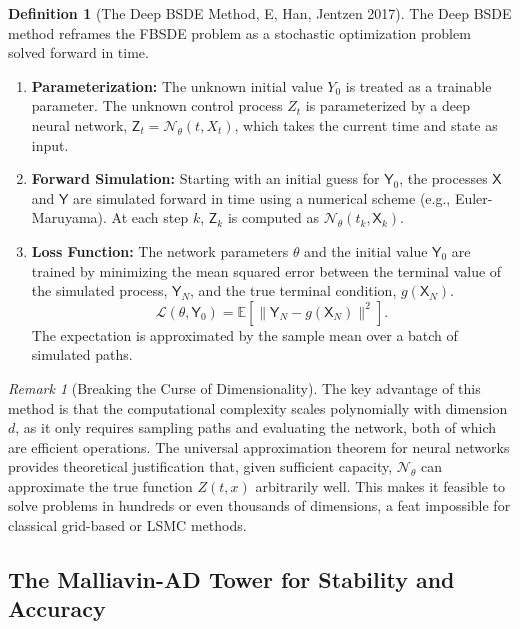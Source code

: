 \documentclass[11pt,letterpaper,oneside]{article}
\theoremstyle{plain}
\theoremstyle{definition}
\newtheorem{definition}[theorem]{Definition}
\theoremstyle{remark}
\newtheorem{remark}{Remark}[section]
\begin{document}
\begin{definition}[The Deep BSDE Method, E, Han, Jentzen 2017]
The Deep BSDE method \cite{EHanJentzen2017} reframes the FBSDE problem as a stochastic optimization problem solved forward in time.
\begin{enumerate}
    \item \textbf{Parameterization:} The unknown initial value \(Y_0\) is treated as a trainable parameter. The unknown control process \(Z_t\) is parameterized by a deep neural network, \(\mathsf{Z}_t = \mathcal{N}_\theta(t, X_t)\), which takes the current time and state as input.
    \item \textbf{Forward Simulation:} Starting with an initial guess for \(\mathsf{Y}_0\), the processes \(\mathsf{X}\) and \(\mathsf{Y}\) are simulated forward in time using a numerical scheme (e.g., Euler-Maruyama). At each step \(k\), \(\mathsf{Z}_k\) is computed as \(\mathcal{N}_\theta(t_k, \mathsf{X}_k)\).
    \item \textbf{Loss Function:} The network parameters \(\theta\) and the initial value \(\mathsf{Y}_0\) are trained by minimizing the mean squared error between the terminal value of the simulated process, \(\mathsf{Y}_N\), and the true terminal condition, \(g(\mathsf{X}_N)\).
    \[
      \mathcal{L}(\theta, \mathsf{Y}_0) = \mathbb{E}\left[ \| \mathsf{Y}_N - g(\mathsf{X}_N) \|^2 \right].
    \]
    The expectation is approximated by the sample mean over a batch of simulated paths.
\end{enumerate}
\end{definition}

\begin{remark}[Breaking the Curse of Dimensionality]
The key advantage of this method is that the computational complexity scales polynomially with dimension \(d\), as it only requires sampling paths and evaluating the network, both of which are efficient operations. The universal approximation theorem for neural networks provides theoretical justification that, given sufficient capacity, \(\mathcal{N}_\theta\) can approximate the true function \(Z(t,x)\) arbitrarily well. This makes it feasible to solve problems in hundreds or even thousands of dimensions, a feat impossible for classical grid-based or LSMC methods.
\end{remark}

\subsection{The Malliavin-AD Tower for Stability and Accuracy}
\label{sec:malliavin_tower_rigorous}
\end{document}
